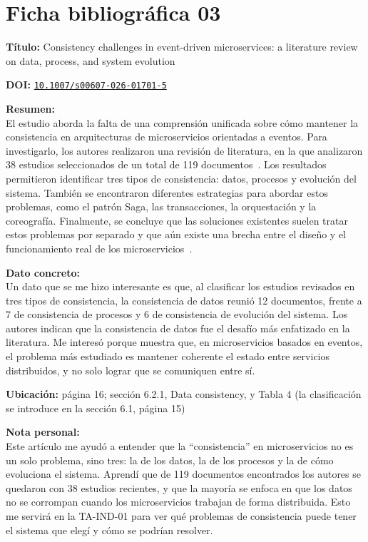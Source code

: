 \documentclass[12pt,a4paper]{article}
\newcommand{\ficha}[6]{%
  \section*{Ficha bibliográfica #1}
  \textbf{Título:} #2

  \textbf{DOI:} \href{https://doi.org/#3}{\nolinkurl{#3}}

  \textbf{Resumen:}\\
  #4

  \textbf{Dato concreto:}\\
  #5

  \textbf{Nota personal:}\\
  #6

  \vspace{0.6cm}
}
\begin{document}
\ficha{03}
{Consistency challenges in event-driven microservices: a literature review on data, process, and system evolution}
{10.1007/s00607-026-01701-5}
{El estudio aborda la falta de una comprensión unificada sobre cómo mantener la consistencia en arquitecturas de microservicios orientadas a eventos. Para investigarlo, los autores realizaron una revisión de literatura, en la que analizaron 38 estudios seleccionados de un total de 119 documentos~\cite{bacao2026consistency}. Los resultados permitieron identificar tres tipos de consistencia: datos, procesos y evolución del sistema. También se encontraron diferentes estrategias para abordar estos problemas, como el patrón Saga, las transacciones, la orquestación y la coreografía. Finalmente, se concluye que las soluciones existentes suelen tratar estos problemas por separado y que aún existe una brecha entre el diseño y el funcionamiento real de los microservicios~\cite{bacao2026consistency}.}
{Un dato que se me hizo interesante es que, al clasificar los estudios revisados en tres tipos de consistencia, la consistencia de datos reunió 12 documentos, frente a 7 de consistencia de procesos y 6 de consistencia de evolución del sistema. Los autores indican que la consistencia de datos fue el desafío más enfatizado en la literatura. Me interesó porque muestra que, en microservicios basados en eventos, el problema más estudiado es mantener coherente el estado entre servicios distribuidos, y no solo lograr que se comuniquen entre sí.

\par\medskip\textbf{Ubicación:} página 16; sección 6.2.1, Data consistency, y Tabla 4 (la clasificación se introduce en la sección 6.1, página 15)}
{Este artículo me ayudó a entender que la “consistencia” en microservicios no es un solo problema, sino tres: la de los datos, la de los procesos y la de cómo evoluciona el sistema. Aprendí que de 119 documentos encontrados los autores se quedaron con 38 estudios recientes, y que la mayoría se enfoca en que los datos no se corrompan cuando los microservicios trabajan de forma distribuida. Esto me servirá en la TA-IND-01 para ver qué problemas de consistencia puede tener el sistema que elegí y cómo se podrían resolver.}
\end{document}
